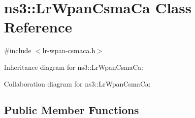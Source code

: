 \hypertarget{classns3_1_1LrWpanCsmaCa}{}\section{ns3\+:\+:Lr\+Wpan\+Csma\+Ca Class Reference}
\label{classns3_1_1LrWpanCsmaCa}


{\ttfamily \#include $<$lr-\/wpan-\/csmaca.\+h$>$}



Inheritance diagram for ns3\+:\+:Lr\+Wpan\+Csma\+Ca\+:


Collaboration diagram for ns3\+:\+:Lr\+Wpan\+Csma\+Ca\+:
\subsection*{Public Member Functions}
